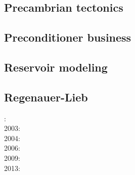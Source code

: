 \subsection{Precambrian tectonics}

{\scriptsize
\noindent
\cite{guto94}
\cite{wemv03}
\cite{sigb10}
\cite{pege11}
\cite{gery14}\cite{gagb14}\cite{sigb14}
\cite{poyd20}
}

\subsection{Preconditioner business}

\cite{benz02}
\cite{bewa08}
\cite{urvs08}

\subsection{Reservoir modeling}

\cite{orwa13}

\subsection{Regenauer-Lieb}

{\scriptsize
{}: \cite{reyu00}\\
2003: \cite{reyu03}\\
2004: \cite{reyu04}\\
2006: \cite{rehy06}\cite{rewr06}\\
2009: \cite{reps09}\\
2013: \cite{revp13}
}

